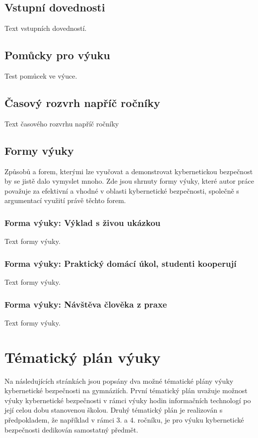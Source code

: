 \documentclass[a4paper, 12pt]{article}
\begin{document}
\subsection{Vstupní dovednosti}
Text vstupních dovedností.

\subsection{Pomůcky pro výuku}
Test pomůcek ve výuce.

\subsection{Časový rozvrh napříč ročníky}
Text časového rozvrhu napříč ročníky

\subsection{Formy výuky}
Způsobů a forem, kterými lze vyučovat a demonstrovat kybernetickou bezpečnost by se jistě dalo vymyslet mnoho. Zde jsou shrnuty formy výuky, které autor práce považuje za efektivní a vhodné v oblasti kybernetické bezpečnosti, společně s argumentací využití právě těchto forem.

\subsubsection{Forma výuky: Výklad s živou ukázkou}
Text formy výuky.

\subsubsection{Forma výuky: Praktický domácí úkol, studenti kooperují}
Text formy výuky.

\subsubsection{Forma výuky: Návštěva člověka z praxe}
Text formy výuky.




\newpage
\section{Tématický plán výuky}
Na následujících stránkách jsou popsány dva možné tématické plány výuky kybernetické bezpečnosti na gymnáziích. První tématický plán uvažuje možnost výuky kybernetické bezpečnosti v rámci výuky hodin informačních technologí po její celou dobu stanovenou školou. Druhý tématický plán je realizován s předpokladem, že například v rámci 3. a 4. ročníku, je pro výuku kybernetické bezpečnosti dedikován samostatný předmět.
\end{document}
